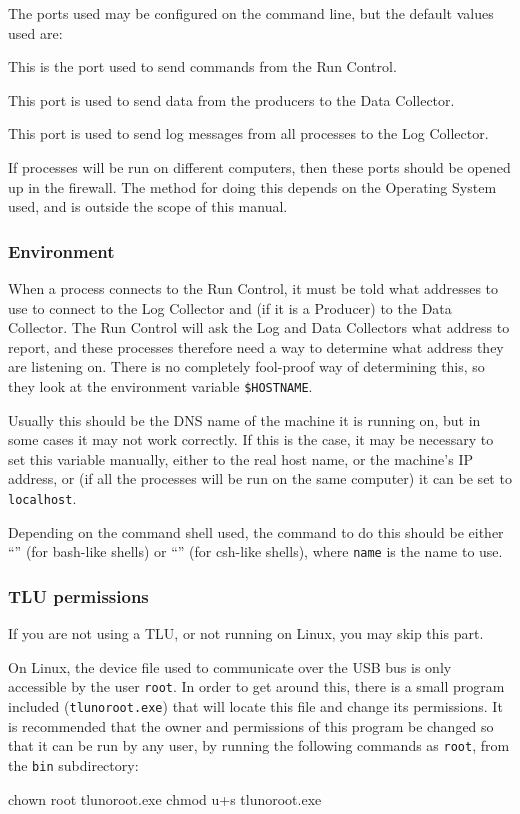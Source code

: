 The ports used may be configured on the command line, but the default values used are:
\begin{description}

This is the port used to send commands from the Run Control.

This port is used to send data from the producers to the Data Collector.

This port is used to send log messages from all processes to the Log Collector.

\end{description}

If processes will be run on different computers,
then these ports should be opened up in the firewall.
The method for doing this depends on the Operating System used,
and is outside the scope of this manual.

\subsubsection{Environment}
When a process connects to the Run Control, it must be told what addresses to use
to connect to the Log Collector and (if it is a Producer) to the Data Collector.
The Run Control will ask the Log and Data Collectors what address to report,
and these processes therefore need a way to determine what address they are listening on.
There is no completely fool-proof way of determining this,
so they look at the environment variable \texttt{\$HOSTNAME}.

Usually this should be the DNS name of the machine it is running on, but in some cases it may not work correctly.
If this is the case, it may be necessary to set this variable manually, either to the real host name,
or the machine's IP address, or (if all the processes will be run on the same computer) it can be set to \texttt{localhost}.

Depending on the command shell used, the command to do this should be either
``'' (for bash-like shells)
or ``'' (for csh-like shells),
where \texttt{name} is the name to use.

\subsubsection{TLU permissions}\label{sec:TLUperm}
If you are not using a TLU, or not running on Linux, you may skip this part.

On Linux, the device file used to communicate over the USB bus is only accessible by the user \texttt{root}.
In order to get around this, there is a small program included (\texttt{tlunoroot.exe}) that will
locate this file and change its permissions.
It is recommended that the owner and permissions of this program be changed so that it can be run by any user,
by running the following commands as \texttt{root}, from the \texttt{bin} subdirectory:
\begin{listing}[mybash]
chown root tlunoroot.exe
chmod u+s tlunoroot.exe
\end{listing}

